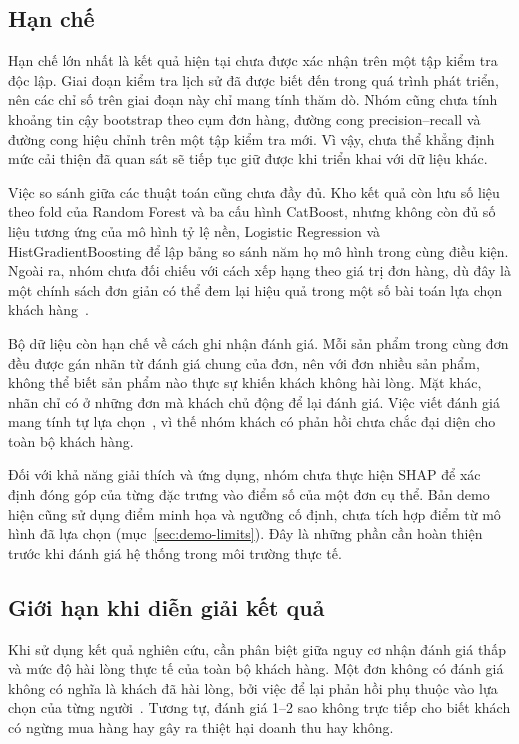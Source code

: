 \documentclass[12pt,a4paper]{report}
\begin{document}
\subsection{Hạn chế}

Hạn chế lớn nhất là kết quả hiện tại chưa được xác nhận trên một tập kiểm tra độc lập. Giai đoạn kiểm tra lịch sử đã được biết đến trong quá trình phát triển, nên các chỉ số trên giai đoạn này chỉ mang tính thăm dò. Nhóm cũng chưa tính khoảng tin cậy bootstrap theo cụm đơn hàng, đường cong precision--recall và đường cong hiệu chỉnh trên một tập kiểm tra mới. Vì vậy, chưa thể khẳng định mức cải thiện đã quan sát sẽ tiếp tục giữ được khi triển khai với dữ liệu khác.

Việc so sánh giữa các thuật toán cũng chưa đầy đủ. Kho kết quả còn lưu số liệu theo fold của Random Forest và ba cấu hình CatBoost, nhưng không còn đủ số liệu tương ứng của mô hình tỷ lệ nền, Logistic Regression và HistGradientBoosting để lập bảng so sánh năm họ mô hình trong cùng điều kiện. Ngoài ra, nhóm chưa đối chiếu với cách xếp hạng theo giá trị đơn hàng, dù đây là một chính sách đơn giản có thể đem lại hiệu quả trong một số bài toán lựa chọn khách hàng~\cite{li2026valuesorting}.

Bộ dữ liệu còn hạn chế về cách ghi nhận đánh giá. Mỗi sản phẩm trong cùng đơn đều được gán nhãn từ đánh giá chung của đơn, nên với đơn nhiều sản phẩm, không thể biết sản phẩm nào thực sự khiến khách không hài lòng. Mặt khác, nhãn chỉ có ở những đơn mà khách chủ động để lại đánh giá. Việc viết đánh giá mang tính tự lựa chọn~\cite{li2008}, vì thế nhóm khách có phản hồi chưa chắc đại diện cho toàn bộ khách hàng.

Đối với khả năng giải thích và ứng dụng, nhóm chưa thực hiện SHAP để xác định đóng góp của từng đặc trưng vào điểm số của một đơn cụ thể. Bản demo hiện cũng sử dụng điểm minh họa và ngưỡng cố định, chưa tích hợp điểm từ mô hình đã lựa chọn (mục~\ref{sec:demo-limits}). Đây là những phần cần hoàn thiện trước khi đánh giá hệ thống trong môi trường thực tế.

\subsection{Giới hạn khi diễn giải kết quả}

Khi sử dụng kết quả nghiên cứu, cần phân biệt giữa nguy cơ nhận đánh giá thấp và mức độ hài lòng thực tế của toàn bộ khách hàng. Một đơn không có đánh giá không có nghĩa là khách đã hài lòng, bởi việc để lại phản hồi phụ thuộc vào lựa chọn của từng người~\cite{li2008}. Tương tự, đánh giá 1--2 sao không trực tiếp cho biết khách có ngừng mua hàng hay gây ra thiệt hại doanh thu hay không.
\end{document}
